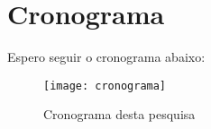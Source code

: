 \chapter{Cronograma}
\label{cap:cronograma}

Espero seguir o cronograma abaixo:

\begin{figure}[h!]
  \centering
  \texttt{[image: cronograma]}
  \caption{Cronograma desta pesquisa}
  \label{fig:cronograma}
\end{figure}
